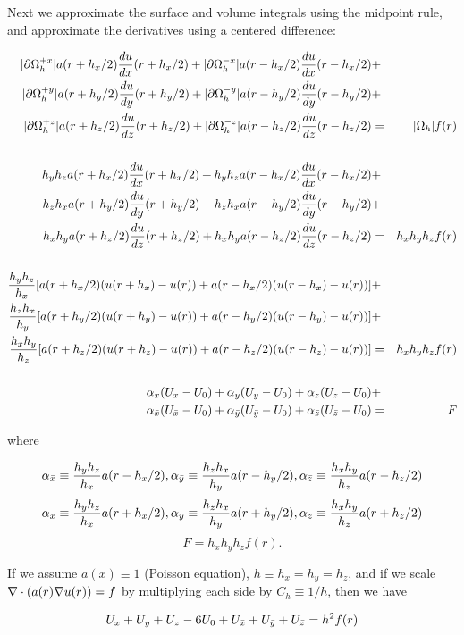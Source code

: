 \documentclass[10pt]{article}
\begin{document}
Next we approximate the surface and volume integrals using the
midpoint rule, and approximate the derivatives using a centered difference:

 \begin{eqnarray*}
 |\partial\Omega_h^{+x}| a(r+h_x/2) \frac{du}{dx}(r+h_x/2) + 
 |\partial\Omega_h^{-x}| a(r-h_x/2) \frac{du}{dx}(r-h_x/2) & + & \\ 
 |\partial\Omega_h^{+y}| a(r+h_y/2) \frac{du}{dy}(r+h_y/2) +
 |\partial\Omega_h^{-y}| a(r-h_y/2) \frac{du}{dy}(r-h_y/2) & + & \\ 
 |\partial\Omega_h^{+z}| a(r+h_z/2) \frac{du}{dz}(r+h_z/2) + 
 |\partial\Omega_h^{-z}| a(r-h_z/2) \frac{du}{dz}(r-h_z/2) & = & |{\Omega_h}| f(r)  \\
\\
 h_y h_z a(r+h_x/2) \frac{du}{dx}(r+h_x/2) + 
 h_y h_z a(r-h_x/2) \frac{du}{dx}(r-h_x/2) & + & \\ 
 h_z h_x a(r+h_y/2) \frac{du}{dy}(r+h_y/2) +
 h_z h_x a(r-h_y/2) \frac{du}{dy}(r-h_y/2) & + & \\ 
 h_x h_y a(r+h_z/2) \frac{du}{dz}(r+h_z/2) + 
 h_x h_y a(r-h_z/2) \frac{du}{dz}(r-h_z/2) & = & h_xh_yh_z f(r)  \\
\\
 \frac{h_y h_z}{h_x} [a(r+h_x/2) (u(r+h_x) - u(r))  + 
                      a(r-h_x/2) (u(r-h_x) - u(r))] & + & \\ 
 \frac{h_z h_x}{h_y} [a(r+h_y/2) (u(r+h_y) - u(r))  + 
                      a(r-h_y/2) (u(r-h_y) - u(r))] & + & \\ 
 \frac{h_x h_y}{h_z} [a(r+h_z/2) (u(r+h_z) - u(r))  + 
                      a(r-h_z/2) (u(r-h_z) - u(r))] & = &  h_xh_yh_z f(r)  \\
\\
 \alpha_{x} (U_{x} - U_{0})  + 
 \alpha_{y} (U_{y} - U_{0})  + 
 \alpha_{z} (U_{z} - U_{0}) & + & \\ 
 \alpha_{\bar{x}} (U_{\bar{x}} - U_{0})  + 
 \alpha_{\bar{y}} (U_{\bar{y}} - U_{0})  + 
 \alpha_{\bar{z}} (U_{\bar{z}} - U_{0}) & = &  F  \\
 \end{eqnarray*}

where

\[\alpha_{\bar{x}}  \equiv  \frac{h_yh_z}{h_x} a(r-h_x/2),
 \alpha_{\bar{y}}  \equiv  \frac{h_zh_x}{h_y} a(r-h_y/2), 
 \alpha_{\bar{z}}  \equiv  \frac{h_xh_y}{h_z} a(r-h_z/2) \]
 \[\alpha_{x}  \equiv  \frac{h_yh_z}{h_x} a(r+h_x/2), 
 \alpha_{y}  \equiv  \frac{h_zh_x}{h_y} a(r+h_y/2),
 \alpha_{z}  \equiv  \frac{h_xh_y}{h_z} a(r+h_z/2) \]
 \[F = h_xh_yh_z f(r). \]

If we assume $a(x)\equiv 1$ (Poisson equation), $h\equiv h_x = h_y =
h_z$, and if we scale $\nabla\cdot(a(r) \nabla u(r)) = f$ by multiplying
each side by $C_h \equiv 1/h$, then we have

\[ U_{x} + U_{y} + U_{z} - 6U_{0} + U_{\bar{x}} + U_{\bar{y}} + U_{\bar{z}} = h^2 f(r) \]
\end{document}
